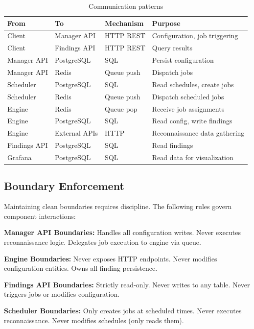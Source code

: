 \documentclass[a4paper,12pt]{report}
\begin{document}
\begin{table}[H]
\centering
\caption{Communication patterns}
\begin{tabular}{|l|l|l|l|}
\hline
\textbf{From} & \textbf{To} & \textbf{Mechanism} & \textbf{Purpose} \\
\hline
Client & Manager API & HTTP REST & Configuration, job triggering \\
\hline
Client & Findings API & HTTP REST & Query results \\
\hline
Manager API & PostgreSQL & SQL & Persist configuration \\
\hline
Manager API & Redis & Queue push & Dispatch jobs \\
\hline
Scheduler & PostgreSQL & SQL & Read schedules, create jobs \\
\hline
Scheduler & Redis & Queue push & Dispatch scheduled jobs \\
\hline
Engine & Redis & Queue pop & Receive job assignments \\
\hline
Engine & PostgreSQL & SQL & Read config, write findings \\
\hline
Engine & External APIs & HTTP & Reconnaissance data gathering \\
\hline
Findings API & PostgreSQL & SQL & Read findings \\
\hline
Grafana & PostgreSQL & SQL & Read data for visualization \\
\hline
\end{tabular}
\label{tab:communication}
\end{table}

\subsection{Boundary Enforcement}

Maintaining clean boundaries requires discipline. The following rules govern component interactions:\hfill \break

\textbf{Manager API Boundaries:} Handles all configuration writes. Never executes reconnaissance logic. Delegates job execution to engine via queue.\hfill \break

\textbf{Engine Boundaries:} Never exposes HTTP endpoints. Never modifies configuration entities. Owns all finding persistence.\hfill \break

\textbf{Findings API Boundaries:} Strictly read-only. Never writes to any table. Never triggers jobs or modifies configuration.\hfill \break

\textbf{Scheduler Boundaries:} Only creates jobs at scheduled times. Never executes reconnaissance. Never modifies schedules (only reads them).\hfill \break
\end{document}
